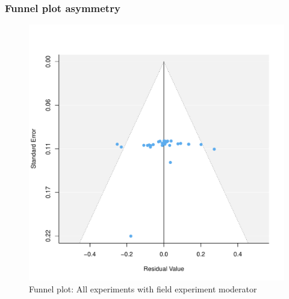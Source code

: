 \documentclass[usenames,dvipsnames]{beamer}
\begin{document}
\begin{frame}[label=supplemental]
\frametitle{Funnel plot asymmetry \hyperlink{pub_bias}{}}

\begin{figure}[!hb]
\vspace*{-3mm}
\includegraphics[scale = 0.45]{../figs/funnel_all_mod.pdf}
\vspace{-0.2cm}
\caption{Funnel plot: All experiments with field experiment moderator}
\small
\vspace{-0.5cm}
\label{fig: funnel_all}
\end{figure}
\end{frame}

\end{document}
